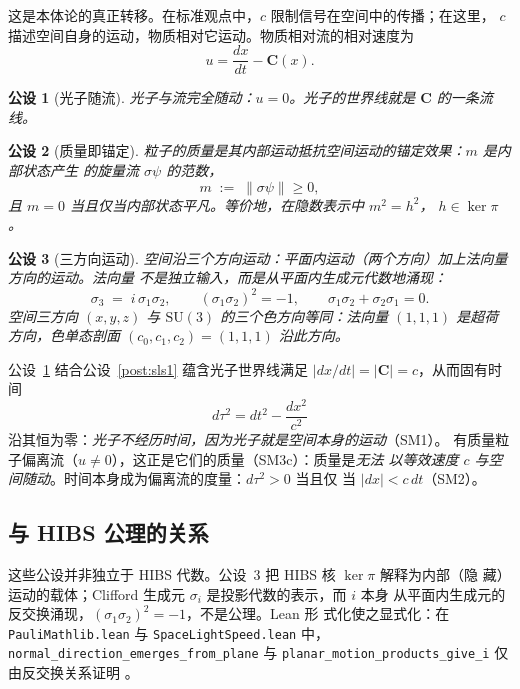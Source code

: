 \documentclass[aps,prd,preprint,superscriptaddress,amsmath,amssymb]{revtex4-2}
\newtheorem{postulate}{公设}[section]
\begin{document}
这是本体论的真正转移。在标准观点中，$c$ 限制信号在空间中的传播；在这里，
$c$ 描述空间自身的运动，物质相对它运动。物质相对流的相对速度为
\begin{equation}
u = \frac{dx}{dt} - \bm{C}(x).
\end{equation}

\begin{postulate}[光子随流]
\label{post:sls2}
光子与流完全随动：$u=0$。光子的世界线就是 $\bm{C}$ 的一条流线。
\end{postulate}

\begin{postulate}[质量即锚定]
\label{post:mc1}
粒子的质量是其内部运动抵抗空间运动的\emph{锚定效果}：$m$ 是内部状态产生
的旋量流 $\sigma\psi$ 的范数，
\begin{equation}
m \;:=\; \|\sigma\psi\| \geq 0,
\end{equation}
且 $m=0$ 当且仅当内部状态平凡。等价地，在隐数表示中 $m^2=h^2$，
$h\in\ker\pi$。
\end{postulate}

\begin{postulate}[三方向运动]
\label{post:three}
空间沿三个方向运动：平面内运动（两个方向）加上法向量方向的运动。法向量
\emph{不是}独立输入，而是从平面内生成元代数地涌现：
\begin{equation}
\sigma_3 \;=\; i\,\sigma_1\sigma_2,
\qquad
(\sigma_1\sigma_2)^2 = -1,
\qquad
\sigma_1\sigma_2 + \sigma_2\sigma_1 = 0 .
\end{equation}
空间三方向 $(x,y,z)$ 与 $\mathrm{SU}(3)$ 的三个色方向等同：法向量
$(1,1,1)$ 是超荷方向，色单态剖面 $(c_0,c_1,c_2)=(1,1,1)$ 沿此方向。
\end{postulate}

公设~\ref{post:sls2} 结合公设~\ref{post:sls1} 蕴含光子世界线满足
$|dx/dt|=|\bm{C}|=c$，从而固有时间
\begin{equation}
d\tau^2 = dt^2 - \frac{dx^2}{c^2}
\end{equation}
沿其恒为零：\emph{光子不经历时间，因为光子就是空间本身的运动}（SM1）。
有质量粒子偏离流（$u\neq 0$），这正是它们的质量（SM3c）：质量是\emph{无法
以等效速度 $c$ 与空间随动}。时间本身成为偏离流的度量：$d\tau^2>0$ 当且仅
当 $|dx|<c\,dt$（SM2）。

\subsection{与 HIBS 公理的关系}

这些公设并非独立于 HIBS 代数。公设~3 把 HIBS 核 $\ker\pi$ 解释为内部（隐
藏）运动的载体；Clifford 生成元 $\sigma_i$ 是投影代数的表示，而 $i$ 本身
从平面内生成元的反交换涌现，$(\sigma_1\sigma_2)^2=-1$，不是公理。Lean 形
式化使之显式化：在 \texttt{PauliMathlib.lean} 与
\texttt{SpaceLightSpeed.lean} 中，\texttt{normal\_direction\_emerges\_from\_plane}
与 \texttt{planar\_motion\_products\_give\_i} 仅由反交换关系证明
\cite{ProjectionPhysics-SLS}。
\end{document}
